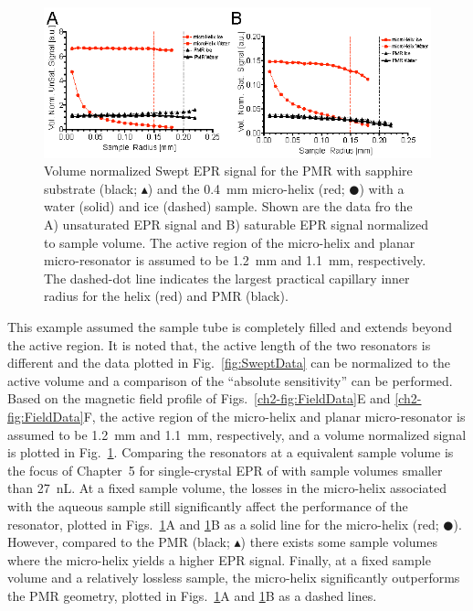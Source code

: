 \begin{figure}[ht]
 \centering
 \includegraphics[width=\textwidth]{Kapitel/Ch2-Images/Ch2-AbsSweepOutput.eps}
 \caption[Volume normalized swept EPR signal optimization.]{Volume normalized Swept EPR signal for the PMR with sapphire substrate (black; $\blacktriangle$) and the 0.4~mm micro-helix (red; $\CIRCLE$) with a water (solid) and ice (dashed) sample. Shown are the data fro the A) unsaturated EPR signal and B) saturable EPR signal normalized to sample volume. The active region of the micro-helix and planar micro-resonator is assumed to be 1.2~mm and 1.1~mm, respectively. The dashed-dot line indicates the largest practical capillary inner radius for the helix (red) and PMR (black).}
 \label{fig:AbsSweptData}
\end{figure}

This example assumed the sample tube is completely filled and extends beyond the active region. It is noted that, the active length of the two resonators is different and the data plotted in Fig.~\ref{fig:SweptData} can be normalized to the active volume and a comparison of the ``absolute sensitivity'' can be performed. Based on the magnetic field profile of  Figs.~\ref{ch2-fig:FieldData}E and \ref{ch2-fig:FieldData}F, the active region of the micro-helix and planar micro-resonator is assumed to be 1.2~mm and 1.1~mm, respectively, and a volume normalized signal is plotted in Fig.~\ref{fig:AbsSweptData}. Comparing the resonators at a equivalent sample volume is the focus of Chapter~5 for single-crystal EPR of with sample volumes smaller than 27~nL. At a fixed sample volume, the losses in the micro-helix associated with the aqueous sample still significantly affect the performance of the resonator, plotted in Figs.~\ref{fig:AbsSweptData}A and \ref{fig:AbsSweptData}B as a solid line for the micro-helix (red; $\CIRCLE$). However, compared to the PMR (black; $\blacktriangle$) there exists some sample volumes where the micro-helix yields a higher EPR signal. Finally, at a fixed sample volume and a relatively lossless sample, the micro-helix significantly outperforms the PMR geometry, plotted in Figs.~\ref{fig:AbsSweptData}A and \ref{fig:AbsSweptData}B as a dashed lines.

